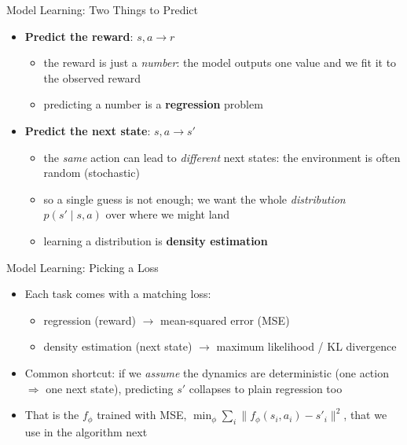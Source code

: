 \begin{frame}{Model Learning: Two Things to Predict}
\begin{itemize}
    \item \textbf{Predict the reward}: \;$s, a \rightarrow r$
    \begin{itemize}
        \item the reward is just a \emph{number}: the model outputs one value
              and we fit it to the observed reward
        \item predicting a number is a \textbf{regression} problem
    \end{itemize}
    \item \textbf{Predict the next state}: \;$s, a \rightarrow s'$
    \begin{itemize}
        \item the \emph{same} action can lead to \emph{different} next states:
              the environment is often random (stochastic)
        \item so a single guess is not enough; we want the whole \emph{distribution}
              $p(s' \mid s, a)$ over where we might land
        \item learning a distribution is \textbf{density estimation}
    \end{itemize}
\end{itemize}
\end{frame}

\begin{frame}{Model Learning: Picking a Loss}
\begin{itemize}
    \item Each task comes with a matching loss:
    \begin{itemize}
        \item regression (reward) $\rightarrow$ mean-squared error (MSE)
        \item density estimation (next state) $\rightarrow$ maximum likelihood /
              KL divergence
    \end{itemize}
    \item Common shortcut: if we \emph{assume} the dynamics are deterministic
          (one action $\Rightarrow$ one next state), predicting $s'$ collapses to
          plain regression too
    \item That is the $f_\phi$ trained with MSE,
          $\min_\phi \sum_i \lVert f_\phi(s_i, a_i) - s'_i \rVert^2$, that we use in
          the algorithm next
\end{itemize}
\end{frame}
